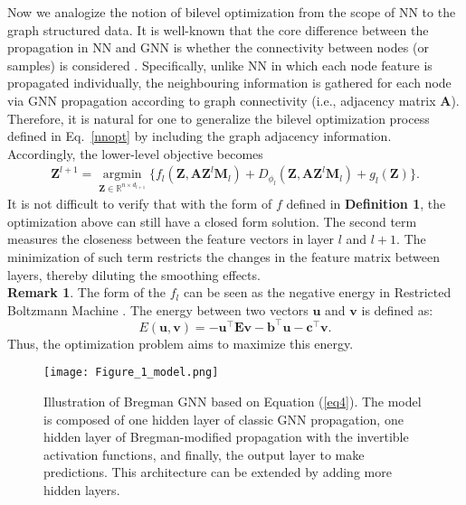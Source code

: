 \documentclass{article}
\begin{document}
Now we analogize the notion of bilevel optimization from the scope of NN to the graph structured data. It is well-known that the core difference between the propagation in NN and GNN is whether the connectivity between nodes (or samples) is considered \cite{kipf2017semisupervised}. Specifically, unlike NN in which each node feature is propagated individually, the neighbouring information is gathered for each node via GNN propagation according to graph connectivity (i.e., adjacency matrix $\mathbf A$). Therefore, it is natural for one to generalize the bilevel optimization process defined in Eq.~\eqref{nnopt} by including the graph adjacency information. Accordingly, the lower-level objective becomes
\begin{align}  \label{gnnopt}
\mathbf Z^{l+1} \!\!= \!\!\!\! \underset{\mathbf Z \in \mathbb{R}^{n \times d_{l+1}}}{\operatorname{argmin}} \!\!\!  \{\! f_l(\mathbf Z, \mathbf A \mathbf Z^l \mathbf M_l)  + D_{\phi_l} (\mathbf Z, \mathbf A \mathbf Z^l \mathbf M_l) \! +\! g_l(\mathbf Z)\!\}.
\end{align}
It is not difficult to verify that with the form of $f$ defined in \textbf{Definition 1}, the optimization above can still have a closed form solution. 
The second term measures the closeness between the feature vectors in layer $l$ and $l+1$. The minimization of such term restricts the changes in the feature matrix between layers, thereby diluting the smoothing effects. 
\\[7pt]
\textbf{Remark 1}.
The form of the $f_l$ can be seen as the negative energy in Restricted Boltzmann Machine \cite{hinton2012practical}. The energy between two vectors $\mathbf{u}$ and  $\mathbf{v}$ is defined as:
$$E(\mathbf{u}, \mathbf{v})=-\mathbf{u}^\top \mathbf{E} \mathbf{v} - \mathbf{b}^\top \mathbf{u}-\mathbf{c}^\top\mathbf{v}.$$
Thus, the optimization problem aims to maximize this energy.

\begin{figure}[t]
\begin{minipage}[b]{1.0\linewidth}
  \centering
\centerline{\texttt{[image: Figure\_1\_model.png]}}
\end{minipage}
\caption{Illustration of Bregman GNN based on Equation (\ref{eq4}). The model is composed of one hidden layer of classic GNN propagation, one hidden layer of Bregman-modified propagation with the invertible activation functions, and finally, the output layer to make predictions. This architecture can be extended by adding more hidden layers.}
\label{fig:method}
\end{figure}
\end{document}
